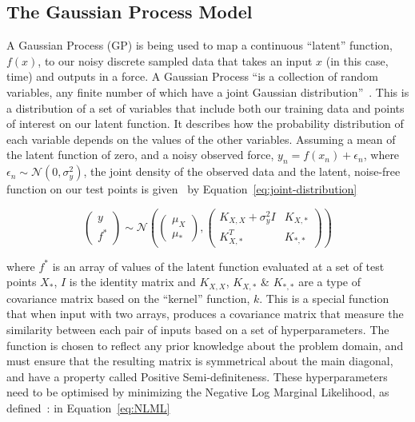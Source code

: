 \documentclass[12pt]{article}
\begin{document}
    \subsection{The Gaussian Process Model}
    A Gaussian Process (GP) is being used to map a continuous ``latent'' function, $f(x)$, to our noisy discrete sampled data that takes an input $x$ (in this case, time) and outputs in a force.
    A Gaussian Process ``is a collection of random variables, any finite number of which have a joint Gaussian distribution''~\cite{rasmussen2006gaussian}.
    This is a distribution of a set of variables that include both our training data and points of interest on our latent function.
    It describes how the probability distribution of each variable depends on the values of the other variables.
    Assuming a mean of the latent function of zero, and a noisy observed force, $y_n = f(x_n)+\epsilon_n$, where $\epsilon_n \sim \mathcal{N}(0, \sigma^2_y)$, the joint density of the observed data and the latent, noise-free function on our test points is given~\cite{murphy2023probabilistic} by Equation~\ref{eq:joint-distribution}

    \begin{equation}
        \begin{pmatrix}
            y \\
            f^*
        \end{pmatrix}
        \sim \mathcal{N} \left(
        \begin{pmatrix}
            \mu_X \\
            \mu_*
        \end{pmatrix},
        \begin{pmatrix}
            K_{X,X} + \sigma^2_y I & K_{X,*} \\
            K_{X,*}^T & K_{*,*}
        \end{pmatrix}
        \right)\label{eq:joint-distribution}
    \end{equation}


    where $f^*$ is an array of values of the latent function evaluated at a set of test points $X_*$, $I$ is the identity matrix and $K_{X,X}$, $K_{X,*}$ \& $K_{*,*}$ are a type of covariance matrix based on the ``kernel'' function, $k$.
    This is a special function that when input with two arrays, produces a covariance matrix that measure the similarity between each pair of inputs based on a set of hyperparameters.
    The function is chosen to reflect any prior knowledge about the problem domain, and must ensure that the resulting matrix is symmetrical about the main diagonal, and have a property called Positive Semi-definiteness.
    These hyperparameters need to be optimised by minimizing the Negative Log Marginal Likelihood, as defined~\cite{murphy2023probabilistic}: in Equation~\ref{eq:NLML}
\end{document}
